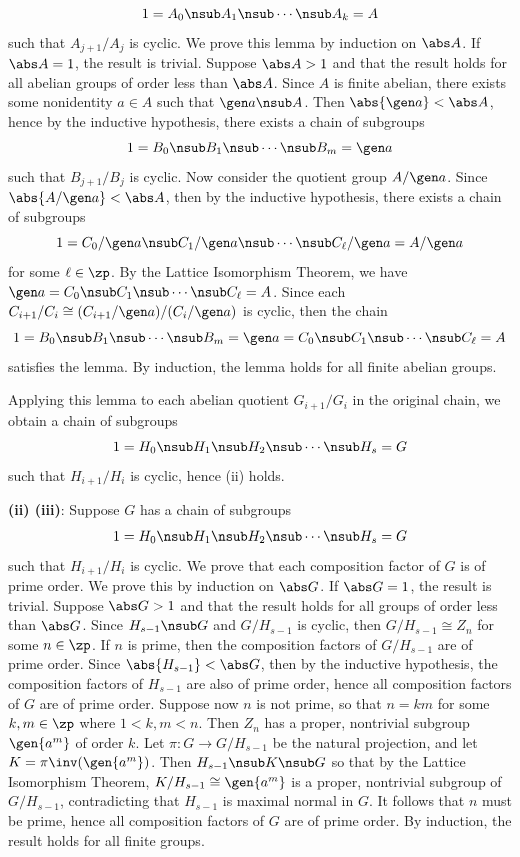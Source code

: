 \begin{problems}
\begin{sol}
        \[1 = A_0 \nsub A_1 \nsub \cdots \nsub A_k = A\]
        such that $A_{j + 1}/A_j$ is cyclic. We prove this lemma by induction on $\abs A$. If $\abs A = 1$, the result is trivial. Suppose $\abs A > 1$ and that the result holds for all abelian groups of order less than $\abs A$. Since $A$ is finite abelian, there exists some nonidentity $a \in A$ such that $\gen a \nsub A$. Then $\abs{\gen a} < \abs A$, hence by the inductive hypothesis, there exists a chain of subgroups
        \[1 = B_0 \nsub B_1 \nsub \cdots \nsub B_m = \gen a\]
        such that $B_{j + 1}/B_j$ is cyclic. Now consider the quotient group $A/\gen a$. Since $\abs{A/\gen a} < \abs A$, then by the inductive hypothesis, there exists a chain of subgroups
        \[1 = C_0/\gen a \nsub C_1/\gen a \nsub \cdots \nsub C_\ell/\gen a = A/\gen a\]
        for some $\ell \in \zp$. By the Lattice Isomorphism Theorem, we have $\gen a = C_0 \nsub C_1 \nsub \cdots \nsub C_\ell = A$. Since each $C_{i + 1}/C_i \cong (C_{i + 1}/\gen a)/(C_i/\gen a)$ is cyclic, then the chain
        \[1 = B_0 \nsub B_1 \nsub \cdots \nsub B_m = \gen a = C_0 \nsub C_1 \nsub \cdots \nsub C_\ell = A\]
        satisfies the lemma. By induction, the lemma holds for all finite abelian groups. 

        Applying this lemma to each abelian quotient $G_{i + 1}/G_i$ in the original chain, we obtain a chain of subgroups
        \[1 = H_0 \nsub H_1 \nsub H_2 \nsub \cdots \nsub H_s = G\]
        such that $H_{i + 1}/H_i$ is cyclic, hence (ii) holds.

        \textbf{(ii) \rightimp (iii)}: Suppose $G$ has a chain of subgroups
        \[1 = H_0 \nsub H_1 \nsub H_2 \nsub \cdots \nsub H_s = G\]
        such that $H_{i + 1}/H_i$ is cyclic. We prove that each composition factor of $G$ is of prime order. We prove this by induction on $\abs G$. If $\abs G = 1$, the result is trivial. Suppose $\abs G > 1$ and that the result holds for all groups of order less than $\abs G$. Since $H_{s - 1} \nsub G$ and $G/H_{s - 1}$ is cyclic, then $G/H_{s - 1} \cong Z_n$ for some $n \in \zp$. If $n$ is prime, then the composition factors of $G/H_{s - 1}$ are of prime order. Since $\abs{H_{s - 1}} < \abs G$, then by the inductive hypothesis, the composition factors of $H_{s - 1}$ are also of prime order, hence all composition factors of $G$ are of prime order. Suppose now $n$ is not prime, so that $n = km$ for some $k, m \in \zp$ where $1 < k, m < n$. Then $Z_n$ has a proper, nontrivial subgroup $\gen{a^m}$ of order $k$. Let $\pi : G \to G/H_{s - 1}$ be the natural projection, and let $K = \pi\inv(\gen{a^m})$. Then $H_{s - 1} \nsub K \nsub G$ so that by the Lattice Isomorphism Theorem, $K/H_{s - 1} \cong \gen{a^m}$ is a proper, nontrivial subgroup of $G/H_{s - 1}$, contradicting that $H_{s - 1}$ is maximal normal in $G$. It follows that $n$ must be prime, hence all composition factors of $G$ are of prime order. By induction, the result holds for all finite groups.


\end{sol}
\end{problems}

